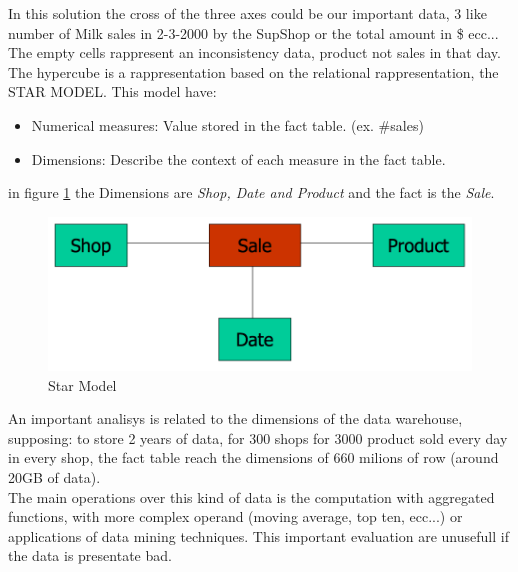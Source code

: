 \documentclass[12pt]{article}
\begin{document}
In this solution the cross of the three axes could be our important data, 3 like number of Milk sales in 2-3-2000 by the SupShop or the total amount in \$ ecc... The empty cells rappresent an inconsistency data, product not sales in that day.\\
The hypercube is a rappresentation based on the relational rappresentation, the STAR MODEL. This model have:
\begin{itemize}
  \item Numerical measures: Value stored in the fact table. (ex. \#sales)
  \item Dimensions: Describe the context of each measure in the fact table.
\end{itemize}
in figure \ref{fig:star} the Dimensions are \textit{Shop, Date and Product} and the fact is the \textit{Sale}.\\
\begin{figure}[h!]
  \includegraphics[width=\linewidth]{images/star.png}
  \caption{Star Model}
  \label{fig:star}
\end{figure}
An important analisys is related to the dimensions of the data warehouse, supposing: to store 2 years of data, for 300 shops for 3000 product sold every day in every shop, the fact table reach the dimensions of 660 milions of row (around 20GB of data).\\
The main operations over this kind of data is the computation with aggregated functions, with more complex operand (moving average, top ten, ecc...) or applications of data mining techniques. This important evaluation are unusefull if the data is presentate bad.
\end{document}

